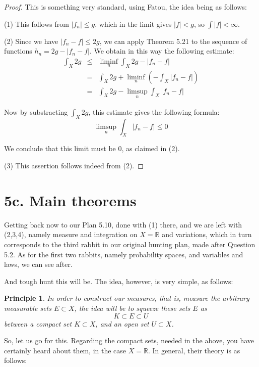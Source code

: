 \documentclass[12pt]{amsbook}
\newtheorem{principle}[theorem]{Principle}
\begin{document}
\begin{proof}
This is something very standard, using Fatou, the idea being as follows:

\medskip

(1) This follows from $|f_n|\leq g$, which in the limit gives $|f|<g$, so $\int|f|<\infty$.

\medskip

(2) Since we have $|f_n-f|\leq 2g$, we can apply Theorem 5.21 to the sequence of functions $h_n=2g-|f_n-f|$. We obtain in this way the following estimate:
\begin{eqnarray*}
\int_X2g
&\leq&\liminf_n\int_X2g-|f_n-f|\\
&=&\int_X2g+\liminf_n\left(-\int_X|f_n-f|\right)\\
&=&\int_X2g-\limsup_n\int_X|f_n-f|
\end{eqnarray*}

Now by substracting $\int_X2g$, this estimate gives the following formula:
$$\limsup_n\int_X|f_n-f|\leq0$$

We conclude that this limit must be 0, as claimed in (2).

\medskip

(3) This assertion follows indeed from (2).
\end{proof}

\section*{5c. Main theorems}

Getting back now to our Plan 5.10, done with (1) there, and we are left with (2,3,4), namely measure and integration on $X=\mathbb R$ and variations, which in turn corresponds to the third rabbit in our original hunting plan, made after Question 5.2. As for the first two rabbits, namely probability spaces, and variables and laws, we can see after.

\bigskip

And tough hunt this will be. The idea, however, is very simple, as follows:

\begin{principle}
In order to construct our measures, that is, measure the arbitrary measurable sets $E\subset X$, the idea will be to squeeze these sets $E$ as 
$$K\subset E\subset U$$
between a compact set $K\subset X$, and an open set $U\subset X$.
\end{principle}

So, let us go for this. Regarding the compact sets, needed in the above, you have certainly heard about them, in the case $X=\mathbb R$. In general, their theory is as follows:
\end{document}
